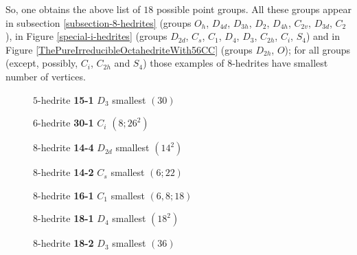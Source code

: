 \documentclass[12pt]{article}
\begin{document}
So, one obtains the above list of $18$ possible point groups. All 
these groups appear in subsection \ref{subsection-8-hedrites} (groups 
$O_h$, $D_{4d}$, $D_{3h}$, $D_{2}$, $D_{4h}$, $C_{2v}$, $D_{3d}$, $C_2$),
in Figure \ref{special-i-hedrites} (groups $D_{2d}$, $C_s$, $C_1$, $D_4$, 
$D_{3}$, $C_{2h}$, $C_{i}$, $S_4$) and in Figure 
\ref{ThePureIrreducibleOctahedriteWith56CC} (groups $D_{2h}$, $O$); for
all groups (except, possibly, $C_i$, $C_{2h}$ and $S_4$) those examples
of $8$-hedrites have smallest number of vertices.


\begin{figure}
{\small
\begin{minipage}[t]{4cm}
\centering
\epsfxsize=4cm
\par
{$5$-hedrite {\bf 15-1} $D_3$ smallest $(30)$}
\end{minipage}
\begin{minipage}[t]{4cm}
\centering
\epsfxsize=4cm
\par
{$6$-hedrite {\bf 30-1} $C_i$ $(8;26^2)$}
\end{minipage}
\begin{minipage}[t]{4cm}
\centering
\epsfxsize=4cm
\par
{$8$-hedrite {\bf 14-4} $D_{2d}$ smallest $(14^2)$}
\end{minipage}
\begin{minipage}[t]{4cm}
\centering
\epsfxsize=4cm
\par
{$8$-hedrite {\bf 14-2} $C_s$ smallest $(6;22)$}
\end{minipage}
\begin{minipage}[t]{4cm}
\centering
\epsfxsize=4cm
\par
{$8$-hedrite {\bf 16-1} $C_1$ smallest $(6, 8; 18)$}
\end{minipage}
\begin{minipage}[t]{4cm}
\centering
\epsfxsize=4cm
\par
{$8$-hedrite {\bf 18-1} $D_4$ smallest $(18^2)$}
\end{minipage}
\begin{minipage}[t]{4cm}
\centering
\epsfxsize=4cm
\par
{$8$-hedrite {\bf 18-2} $D_3$ smallest $(36)$}
\end{minipage}
\begin{minipage}[t]{4cm}
\centering

\end{minipage}}
\end{figure}
\end{document}
